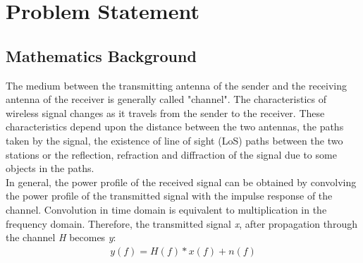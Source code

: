 \chapter{Problem Statement}
\label{cha:PS}
\section{Mathematics Background}
\label{sec:MB}
The medium between the transmitting antenna of the sender and the receiving antenna of the receiver is generally called "channel". The characteristics of wireless signal changes as it travels from the sender to the receiver. These characteristics depend upon the distance between the two antennas, the paths taken by the signal, the existence of line of sight (LoS) paths between the two stations or the reflection, refraction and diffraction of the signal due to some objects in the paths. \\
In general, the power profile of the received signal can be obtained by convolving the power profile of the transmitted signal with the impulse response of the channel. Convolution in time domain is
equivalent to multiplication in the frequency domain. Therefore, the transmitted signal \textit{x}, after propagation through the channel \textit{H} becomes \textit{y}:
\begin{gather}
    y(f) = H(f)*x(f)+n(f)
\end{gather}

